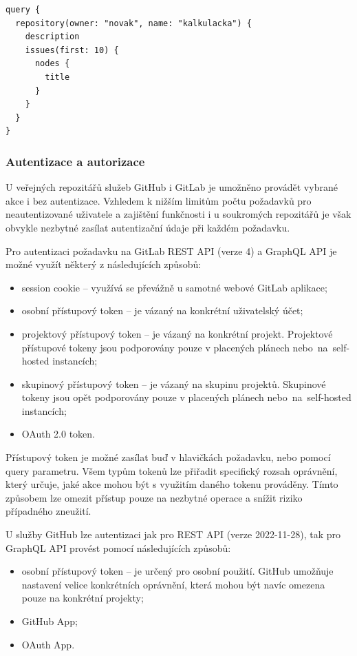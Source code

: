 \begin{listing}[h!]
    \caption{Získání informací o repozitáři a issues pomocí GraphQL API}\label{listing:graphql-query-example}
    \begin{verbatim}
query {
  repository(owner: "novak", name: "kalkulacka") {
    description
    issues(first: 10) {
      nodes {
        title
      }
    }
  }
}
    \end{verbatim}
\end{listing}

\subsubsection{Autentizace a autorizace}
U veřejných repozitářů služeb GitHub i GitLab je umožněno provádět vybrané akce i bez autentizace. Vzhledem k nižším limitům počtu požadavků pro neautentizované uživatele a zajištění funkčnosti i u soukromých repozitářů je však obvykle nezbytné zasílat autentizační údaje při každém požadavku.

Pro autentizaci požadavku na GitLab REST API (verze 4) a GraphQL API je možné využít některý z následujících způsobů:
\begin{itemize}[topsep=4pt, itemsep=2pt]
  \item session cookie -- využívá se převážně u samotné webové GitLab aplikace;
  \item osobní přístupový token -- je vázaný na konkrétní uživatelský účet;
  \item projektový přístupový token -- je vázaný na konkrétní projekt. Projektové přístupové tokeny jsou podporovány pouze v placených plánech nebo~na~self-hosted instancích;
  \item skupinový přístupový token -- je vázaný na skupinu projektů. Skupinové tokeny jsou opět podporovány pouze v placených plánech nebo~na~self-hosted instancích;
  \item OAuth 2.0 token.
\end{itemize}

Přístupový token je možné zasílat buď v hlavičkách požadavku, nebo pomocí query parametru. Všem typům tokenů lze přiřadit specifický rozsah oprávnění, který určuje, jaké akce mohou být s využitím daného tokenu prováděny. Tímto způsobem lze omezit přístup pouze na nezbytné operace a snížit riziko případného zneužití. \cite{GitLab-REST-auth, GitLab-auth}

U služby GitHub lze autentizaci jak pro REST API (verze 2022-11-28), tak pro GraphQL API provést pomocí následujících způsobů:
\begin{itemize}[topsep=4pt, itemsep=2pt]
  \item osobní přístupový token -- je určený pro osobní použití. GitHub umožňuje nastavení velice konkrétních oprávnění, která mohou být navíc omezena pouze na konkrétní projekty;
  \item GitHub App;
  \item OAuth App.
\end{itemize}

